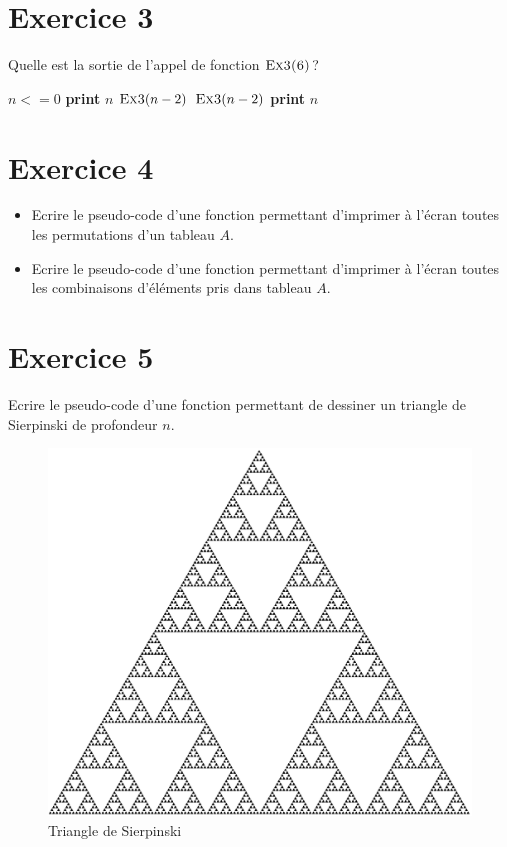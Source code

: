 \documentclass[a4paper,10pt]{article}
\begin{document}
\section*{Exercice 3}

Quelle est la sortie de l'appel de fonction $\textnormal{\scshape Ex3(6)}$?

\begin{codebox}
    \li \If $n <= 0$
    \li \Then   \Return
    \li \Else
    \li       \textbf{print} $n$
    \li       $\textnormal{\scshape Ex3}(n-2)$
    \li       $\textnormal{\scshape Ex3}(n-2)$
    \li       \textbf{print} $n$
        \End
    \End
\end{codebox}
\vspace{0.5cm}

\section*{Exercice 4}

\begin{itemize}
\item Ecrire le pseudo-code d'une fonction permettant d'imprimer à l'écran toutes les permutations d'un tableau $A$.
\item Ecrire le pseudo-code d'une fonction permettant d'imprimer à l'écran toutes les combinaisons d'éléments pris dans tableau $A$.
\end{itemize}

\section*{Exercice 5}

Ecrire le pseudo-code d'une fonction permettant de dessiner un triangle de Sierpinski de profondeur $n$.

\begin{figure}[h]
    \center
    \includegraphics[scale=0.25]{triangle.png}
    \caption{Triangle de Sierpinski}
\end{figure}
\end{document}
